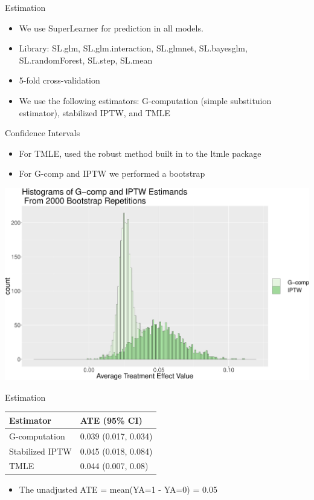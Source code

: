 \documentclass[ignorenonframetext,]{beamer}
\providecommand{\tightlist}{%
  \setlength{\itemsep}{0pt}\setlength{\parskip}{0pt}}
\begin{document}
\begin{frame}{Estimation}

\begin{itemize}
\item
  We use SuperLearner for prediction in all models.
\item
  Library: SL.glm, SL.glm.interaction, SL.glmnet, SL.bayesglm,
  SL.randomForest, SL.step, SL.mean
\item
  5-fold cross-validation
\item
  We use the following estimators: G-computation (simple substituion
  estimator), stabilized IPTW, and TMLE
\end{itemize}

\end{frame}

\begin{frame}{Confidence Intervals}

\begin{itemize}
\item
  For TMLE, used the robust method built in to the ltmle package
\item
  For G-comp and IPTW we performed a bootstrap
\end{itemize}

\includegraphics{Final_Project_Coding_files/figure-beamer/unnamed-chunk-4-1.pdf}

\end{frame}

\begin{frame}{Estimation}

\begin{longtable}[]{@{}ll@{}}
\toprule
Estimator & ATE (95\% CI)\tabularnewline
\midrule
\endhead
G-computation & 0.039 (0.017, 0.034)\tabularnewline
Stabilized IPTW & 0.045 (0.018, 0.084)\tabularnewline
TMLE & 0.044 (0.007, 0.08)\tabularnewline
\bottomrule
\end{longtable}

\begin{itemize}
\tightlist
\item
  The unadjusted ATE = mean(Y\textbar{}A=1 - Y\textbar{}A=0) = 0.05
\end{itemize}

\end{frame}
\end{document}
